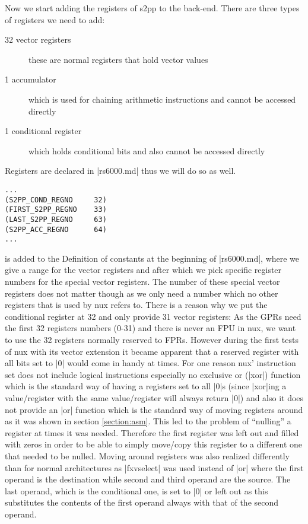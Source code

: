 Now we start adding the registers of s2pp to the back-end.
There are three types of registers we need to add:
\begin{description}
    \item[32 vector registers] these are normal registers that hold vector values
    \item[1 accumulator] which is used for chaining arithmetic instructions and cannot be accessed directly
    \item[1 conditional register] which holds conditional bits and also cannot be accessed directly
\end{description}
Registers are declared in |rs6000.md| thus we will do so as well.
\begin{lstlisting}
...
(S2PP_COND_REGNO     32)
(FIRST_S2PP_REGNO    33)
(LAST_S2PP_REGNO     63)
(S2PP_ACC_REGNO      64)
...
\end{lstlisting}
is added to the Definition of constants at the beginning of |rs6000.md|, where we give a range for the vector registers and after which we pick specific register numbers for the special vector registers.
The number of these special vector registers does not matter though as we only need a number which no other registers that is used by nux refers to.
There is a reason why we put the conditional register at 32 and only provide 31 vector registers:
As the GPRs need the first 32 registers numbers (0-31) and there is never an FPU in nux, we want to use the 32 registers normally reserved to FPRs.
However during the first tests of nux with its vector extension it became apparent that a reserved register with all bits set to |0| would come in handy at times.
For one reason nux' instruction set does not include logical instructions especially no exclusive or (|xor|) function which is the standard way of having a registers set to all |0|s (since |xor|ing a value/register with the same value/register will always return |0|) and also it does not provide an |or| function which is the standard way of moving registers around as it was shown in section \ref{section:asm}.
This led to the problem of ``nulling'' a register at times it was needed.
Therefore the first register was left out and filled with zeros in order to be able to simply move/copy this register to a different one that needed to be nulled.
Moving around registers was also realized differently than for normal architectures as |fxvselect| was used instead of |or| where the first operand is the destination while second and third operand are the source.
The last operand, which is the conditional one, is set to |0| or left out as this substitutes the contents of the first operand always with that of the second operand.
